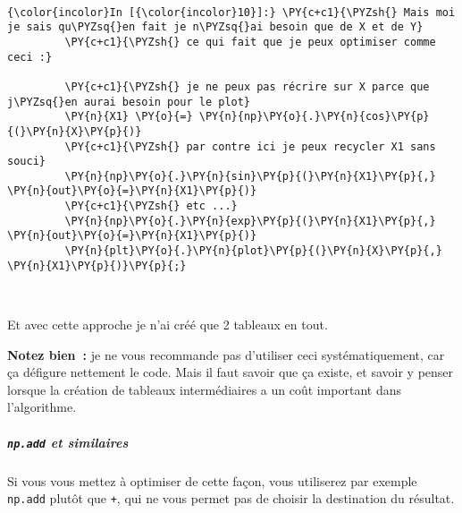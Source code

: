     \begin{center}
    \end{center}
    { \hspace*{\fill} \\}
    
    \begin{Verbatim}[commandchars=\\\{\}]
{\color{incolor}In [{\color{incolor}10}]:} \PY{c+c1}{\PYZsh{} Mais moi je sais qu\PYZsq{}en fait je n\PYZsq{}ai besoin que de X et de Y}
         \PY{c+c1}{\PYZsh{} ce qui fait que je peux optimiser comme ceci :}
         
         \PY{c+c1}{\PYZsh{} je ne peux pas récrire sur X parce que j\PYZsq{}en aurai besoin pour le plot}
         \PY{n}{X1} \PY{o}{=} \PY{n}{np}\PY{o}{.}\PY{n}{cos}\PY{p}{(}\PY{n}{X}\PY{p}{)}
         \PY{c+c1}{\PYZsh{} par contre ici je peux recycler X1 sans souci}
         \PY{n}{np}\PY{o}{.}\PY{n}{sin}\PY{p}{(}\PY{n}{X1}\PY{p}{,} \PY{n}{out}\PY{o}{=}\PY{n}{X1}\PY{p}{)}
         \PY{c+c1}{\PYZsh{} etc ...}
         \PY{n}{np}\PY{o}{.}\PY{n}{exp}\PY{p}{(}\PY{n}{X1}\PY{p}{,} \PY{n}{out}\PY{o}{=}\PY{n}{X1}\PY{p}{)}
         \PY{n}{plt}\PY{o}{.}\PY{n}{plot}\PY{p}{(}\PY{n}{X}\PY{p}{,} \PY{n}{X1}\PY{p}{)}\PY{p}{;}
\end{Verbatim}


    \begin{center}
    \end{center}
    { \hspace*{\fill} \\}
    
    Et avec cette approche je n'ai créé que 2 tableaux en tout.

    \textbf{Notez bien~:} je ne vous recommande pas d'utiliser ceci
systématiquement, car ça défigure nettement le code. Mais il faut savoir
que ça existe, et savoir y penser lorsque la création de tableaux
intermédiaires a un coût important dans l'algorithme.

    \hypertarget{np.add-et-similaires}{%
\subparagraph{\texorpdfstring{\texttt{np.add} et
similaires}{np.add et similaires}}\label{np.add-et-similaires}}

    Si vous vous mettez à optimiser de cette façon, vous utiliserez par
exemple \texttt{np.add} plutôt que \texttt{+}, qui ne vous permet pas de
choisir la destination du résultat.

